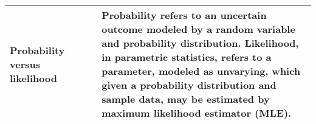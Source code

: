 \begin{singlespace}
\begin{longtable}{p{0.3\linewidth}p{0.7\linewidth}}
\makecell[r]{\textbf{Probability versus}\\ \textbf{likelihood}} & Probability refers to an uncertain outcome modeled by a random variable and probability distribution. Likelihood, in parametric statistics, refers to a parameter, modeled as unvarying, which given a probability distribution and sample data, may be estimated by maximum likelihood estimator (MLE).\\
\hline
\end{longtable}
\end{singlespace}


